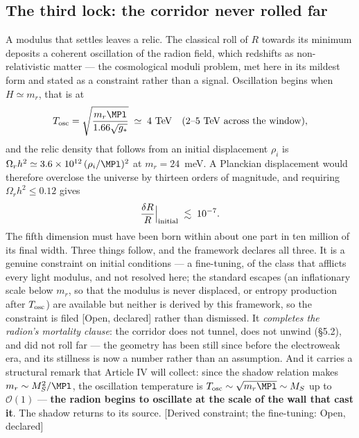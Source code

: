 \subsection{The third lock: the corridor never rolled far}
A modulus that settles leaves a relic. The classical roll of $R$ towards its minimum deposits a coherent oscillation of the radion field, which redshifts as non-relativistic matter --- the cosmological moduli problem, met here in its mildest form and stated as a constraint rather than a signal. Oscillation begins when $H\simeq m_{r}$, that is at
\begin{equation}
T_{\rm osc}=\sqrt{\frac{m_{r}\MPl}{1.66\sqrt{g_{*}}}}\;\simeq\;4~\mathrm{TeV}\quad (2\text{--}5~\mathrm{TeV}\ \text{across the window}),
\end{equation}
and the relic density that follows from an initial displacement $\rho_{i}$ is $\Omega_{r}h^{2}\simeq3.6\times10^{12}\,(\rho_{i}/\MPl)^{2}$ at $m_{r}=24$~meV. A Planckian displacement would therefore overclose the universe by thirteen orders of magnitude, and requiring $\Omega_{r}h^{2}\leq0.12$ gives
\begin{equation}
\frac{\delta R}{R}\Big|_{\rm initial}\;\lesssim\;10^{-7}.
\end{equation}
The fifth dimension must have been born within about one part in ten million of its final width. Three things follow, and the framework declares all three. It is a genuine constraint on initial conditions --- a fine-tuning, of the class that afflicts every light modulus, and not resolved here; the standard escapes (an inflationary scale below $m_{r}$, so that the modulus is never displaced, or entropy production after $T_{\rm osc}$) are available but neither is derived by this framework, so the constraint is filed [Open, declared] rather than dismissed. It \emph{completes the radion's mortality clause}: the corridor does not tunnel, does not unwind (\S5.2), and did not roll far --- the geometry has been still since before the electroweak era, and its stillness is now a number rather than an assumption. And it carries a structural remark that Article IV will collect: since the shadow relation makes $m_{r}\sim M_{S}^{2}/\MPl$, the oscillation temperature is $T_{\rm osc}\sim\sqrt{m_{r}\MPl}\sim M_{S}$ up to $\mathcal{O}(1)$ --- \textbf{the radion begins to oscillate at the scale of the wall that cast it}. The shadow returns to its source. [Derived constraint; the fine-tuning: Open, declared]

